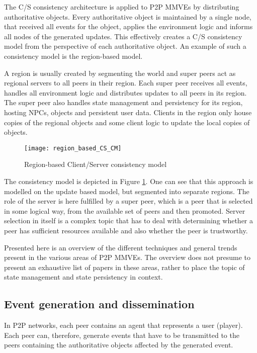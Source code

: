 The C/S consistency architecture is applied to P2P MMVEs by distributing authoritative objects. Every authoritative object is maintained by a single node, that received all events for the object, applies the environment logic and informs all nodes of the generated updates. This effectively creates a C/S consistency model from the perspective of each authoritative object. An example of such a consistency model is the region-based model.

A region is usually created by segmenting the world and super peers act as regional servers to all peers in their region. Each super peer receives all events, handles all environment logic and distributes updates to all peers in its region. The super peer also handles state management and persistency for its region, hosting NPCs, objects and persistent user data. Clients in the region only house copies of the regional objects and some client logic to update the local copies of objects.

\begin{figure}[htbp]
 \centering
 \texttt{[image: region\_based\_CS\_CM]}
 \caption{Region-based Client/Server consistency model}
 \label{fig_cs_region_cm}
\end{figure}
%
The consistency model is depicted in Figure \ref{fig_cs_region_cm}. One can see that this approach is modelled on the update based model, but segmented into separate regions. The role of the server is here fulfilled by a super peer, which is a peer that is selected in some logical way, from the available set of peers and then promoted. Server selection in itself is a complex topic that has to deal with determining whether a peer has sufficient resources available and also whether the peer is trustworthy.

Presented here is an overview of the different techniques and general trends present in the various areas of P2P MMVEs. The overview does not presume to present an exhaustive list of papers in these
areas, rather to place the topic of state management and state persistency in context.


\subsection{Event generation and dissemination}

In P2P networks, each peer contains an agent that represents a user (player). Each peer can, therefore, generate events that have to be transmitted to the peers containing the authoritative objects affected by the generated event.

